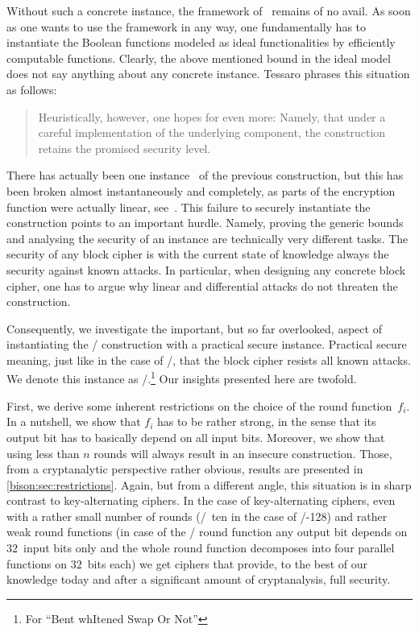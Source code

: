 Without such a concrete instance, the framework of~\cite{AC:Tessaro15} remains of no avail.
As soon as one wants to use the framework in any way, one fundamentally has to instantiate the Boolean functions modeled as ideal functionalities by efficiently computable functions.
Clearly, the above mentioned bound in the ideal model does not say anything about any concrete instance.
Tessaro phrases this situation as follows:
\begin{quote}
    Heuristically, however, one hopes for even more: Namely, that under a careful implementation of the underlying component, the construction retains the promised security level.
    \hfill{}\cite{AC:Tessaro15}
\end{quote}

There has actually been one instance~\cite{C:HoaMorRog12} of the previous construction, but this has been broken almost instantaneously and completely, as parts of the encryption function were actually linear, see~\cite{C:Vaudenay12rump}.
This failure to securely instantiate the construction points to an important hurdle.
Namely, proving the generic bounds and analysing the security of an instance are technically very different tasks.
The security of any block cipher is with the current state of knowledge always the security against known attacks.
In particular, when designing any concrete block cipher, one has to argue why linear and differential attacks do not threaten the construction.

Consequently, we investigate the important, but so far overlooked, aspect of instantiating the \WSN/ construction with a practical secure instance.
Practical secure meaning, just like in the case of \AES/, that the block cipher resists all known attacks.
We denote this instance as \bison/.\footnote{%
    For \enquote{Bent whItened Swap Or Not}
}
Our insights presented here are twofold.

First, we derive some inherent restrictions on the choice of the round function~$f_i$.
In a nutshell, we show that $f_i$ has to be rather strong, in the sense that its output bit has to basically depend on all input bits.
Moreover, we show that using less than $n$ rounds will always result in an insecure construction.
Those, from a cryptanalytic perspective rather obvious, results  are presented in \cref{bison:sec:restrictions}.
Again, but from a different angle, this situation is in sharp contrast to key-alternating ciphers.
In the case of key-alternating ciphers, even with a rather small number of rounds (\eg/~ten in the case of \AES/-128) and rather weak round functions (in case of the \AES/ round function any output bit depends on $32$~input bits only and the whole round function decomposes into four parallel functions on $32$~bits each) we get ciphers that provide, to the best of our knowledge today and after a significant amount of cryptanalysis, full security.

